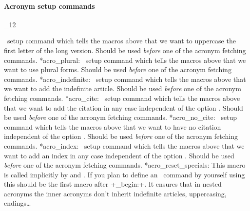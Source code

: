 \documentclass[load-preamble+]{cnltx-doc}
\makeatletter
\renewenvironment{commands}
  {%
    \cnltx@set@catcode_{12}%
    \let\command\cnltx@command
    \cnltxlist
  }
  {\endcnltxlist}
\makeatother
\begin{document}
\paragraph{Acronym setup commands}
\begin{commands}
  \command*{acro_first_upper:}
    \acro\ setup command which tells the macros above that we want to
    uppercase the first letter of the long version.  Should be used
    \emph{before} one of the acronym fetching commands.
  \command*{acro_plural:}
    \acro\ setup command which tells the macros above that we want to use
    plural forms. Should be used \emph{before} one of the acronym fetching
    commands.
  \command*{acro_indefinite:}
    \acro\ setup command which tells the macros above that we want to add the
    indefinite article.  Should be used \emph{before} one of the acronym
    fetching commands.
  \command*{acro_cite:}
    \acro\ setup command which tells the macros above that we want to add the
    citation in any case independent of the option .  Should be
    used \emph{before} one of the acronym fetching commands.
  \command*{acro_no_cite:}
    \acro\ setup command which tells the macros above that we want to have no
    citation independent of the option .  Should be used
    \emph{before} one of the acronym fetching commands.
  \command*{acro_index:}
    \acro\ setup command which tells the macros above that we want to add an
    index in any case independent of the option .  Should be
    used \emph{before} one of the acronym fetching commands.
  \command*{acro_reset_specials:}
    This macro is called implicitly by 
    and .  If you plan to define an \acro\ command by
    yourself using  this should be the first macro
    after \verbcode+\acro_begin:+.  It ensures that in nested acronyms the
    inner acronyms don't inherit indefinite articles, uppercasing,
    endings\ldots
\end{commands}
\end{document}
